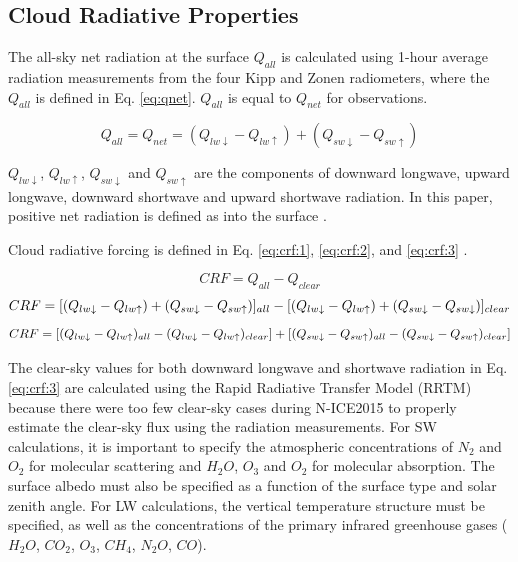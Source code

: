 \subsection{Cloud Radiative Properties}
The all-sky net radiation at the surface $Q_{all}$ is calculated using 1-hour average radiation measurements from the four Kipp and Zonen radiometers, where the $Q_{all}$ is defined in Eq. \ref{eq:qnet}. $Q_{all}$ is equal to $Q_{net}$ for observations.

\begin{equation}\label{eq:qnet}
Q_{all} = Q_{net} = (Q_{lw \downarrow} - Q_{lw \uparrow}) + (Q_{sw \downarrow} - Q_{sw \uparrow})
\end{equation}

$Q_{lw \downarrow}$, $Q_{lw \uparrow}$, $Q_{sw \downarrow}$ and $Q_{sw \uparrow}$ are the components of downward longwave, upward longwave, downward shortwave and upward shortwave radiation. In this paper, positive net radiation is defined as into the surface \citep{miller:2015}.

Cloud radiative forcing is defined in Eq. \ref{eq:crf:1}, \ref{eq:crf:2}, and \ref{eq:crf:3} \citep{ramanathan:1989, miller:2015}.

\begin{equation}\label{eq:crf:1}
CRF = Q_{all} - Q_{clear}
\end{equation}
\begin{dmath}\label{eq:crf:2}
CRF = [(Q_{lw \downarrow} - Q_{lw \uparrow}) + (Q_{sw \downarrow} - Q_{sw \uparrow})]_{all} \\
\\ - [(Q_{lw \downarrow} - Q_{lw \uparrow}) + (Q_{sw \downarrow} - Q_{sw \downarrow})]_{clear}
\end{dmath}
\begin{dmath}\label{eq:crf:3}
CRF = [(Q_{lw \downarrow} - Q_{lw \uparrow})_{all} - (Q_{lw \downarrow} - Q_{lw \uparrow})_{clear}] \\
\\ + [(Q_{sw \downarrow} - Q_{sw \uparrow})_{all} -  (Q_{sw \downarrow} - Q_{sw \uparrow})_{clear}]
\end{dmath}

The clear-sky values for both downward longwave and shortwave radiation in Eq. \ref{eq:crf:3} are calculated using the Rapid Radiative Transfer Model (RRTM) \citep{mlawer:1997} because there were too few clear-sky cases during N-ICE2015 to properly estimate the clear-sky flux using the radiation measurements. For SW calculations, it is important to specify the atmospheric concentrations of $N_{2}$ and $O_{2}$ for molecular scattering and $H_{2}O$, $O_{3}$ and $O_{2}$ for molecular absorption. The surface albedo must also be specified as a function of the surface type and solar zenith angle. For LW calculations, the vertical temperature structure must be specified, as well as the concentrations of the primary infrared greenhouse gases ($H_{2}O$, $CO_{2}$, $O_{3}$, $CH_{4}$, $N_{2}O$, $CO$).

